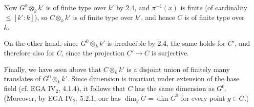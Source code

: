 Now $G^0\otimes_kk'$ is of finite type over $k'$ by 2.4, and $\pi^{-1}(x)$ is finite (of cardinality $\leq[k':k]$), so $C\otimes_kk'$ is of finite type over $k'$, and hence $C$ is of finite type over $k$.

On the other hand, since $G^0\otimes_kk'$ is irreducible by 2.4, the same holds for $C'$, and therefore also for $C$, since the projection $C'\to C$ is surjective.

Finally, we have seen above that $C\otimes_kk'$ is a disjoint union of finitely many translates of $G^0\otimes_kk'$. Since dimension is invariant under extension of the base field (cf. EGA IV$_2$, 4.1.4), it follows that $C$ has the same dimension as $G^0$. (Moreover, by EGA IV$_2$, 5.2.1, one has $\dim_gG=\dim G^0$ for every point $g\in G$.)

